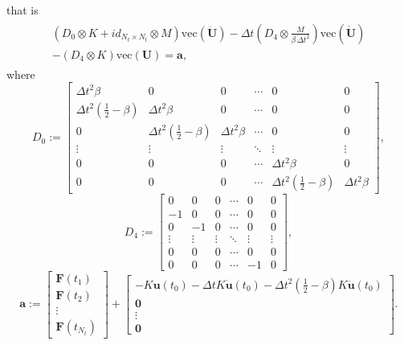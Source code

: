 \documentclass[a4paper, 10pt]{article}
\begin{document}
that is
\begin{align}
\begin{array}{c}
\left(D_0 \otimes K + id_{N_t \times N_t} \otimes  M  \right) \mathrm{vec}(\ddot{\mathbf{U}}) - \Delta t \left(D_4 \otimes  \frac{M}{\beta\, \Delta t^2}\right)\mathrm{vec}(\dot{\mathbf{U}}) \\
- \left( D_4 \otimes   K\right)\mathrm{vec}(\mathbf{U}) =
\mathbf{a},
\end{array}\label{newmark1}
\end{align}
where
$$
D_0 := \left[
\begin{array}{cccccc}
\Delta t^2 \beta  & 0 & 0 & \cdots & 0 & 0 \\
\Delta t^2 \left(\frac{1}{2} - \beta \right) & \Delta t^2 \beta & 0 & \cdots & 0 & 0 \\
0 & \Delta t^2 \left(\frac{1}{2} - \beta \right) & \Delta t^2 \beta & \cdots & 0 & 0 \\
\vdots & \vdots & \vdots & \ddots & \vdots & \vdots \\
0 & 0 & 0 & \cdots & \Delta t^2 \beta & 0 \\
0 & 0 & 0 & \cdots & \Delta t^2 \left(\frac{1}{2} - \beta \right) & \Delta t^2 \beta  
\end{array}  
\right],
$$
$$
D_4 := \left[
\begin{array}{cccccc}
0  & 0 & 0 & \cdots & 0 & 0 \\
-1 & 0 & 0 & \cdots & 0 & 0 \\
0 & -1 & 0 & \cdots & 0 & 0 \\
\vdots & \vdots & \vdots & \ddots & \vdots & \vdots \\
0 & 0 & 0 & \cdots & 0 & 0 \\
0 & 0 & 0 & \cdots & -1 & 0 
\end{array}  
\right],
$$
$$
\mathbf{a}:= \left[
\begin{array}{c}
\mathbf{F}(t_1)\\
\mathbf{F}(t_2) \\
\vdots \\
\mathbf{F}(t_{N_t}) 
\end{array}
\right] + 
\left[
\begin{array}{c}
-  K  \mathbf{u}(t_0) - \Delta t K \dot{\mathbf{u}}(t_0) - \Delta t^2 \left( \frac{1}{2}-\beta \right) K \ddot{\mathbf{u}}(t_0)\\
\mathbf{0} \\
\vdots \\
\mathbf{0} 
\end{array}
\right].
$$
\end{document}
